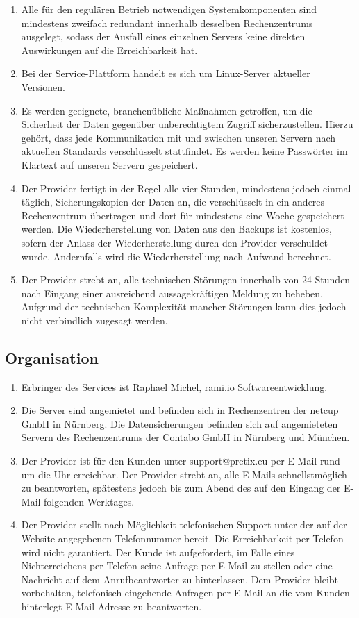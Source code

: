 \documentclass{terms}
\begin{document}
\begin{enumerate}
\item Alle für den regulären Betrieb notwendigen Systemkomponenten sind mindestens zweifach redundant innerhalb desselben Rechenzentrums ausgelegt, sodass der Ausfall eines einzelnen Servers keine direkten Auswirkungen auf die Erreichbarkeit hat.
\item Bei der Service-Plattform handelt es sich um Linux-Server aktueller Versionen.
\item Es werden geeignete, branchenübliche Maßnahmen getroffen, um die Sicherheit der Daten gegenüber unberechtigtem Zugriff sicherzustellen. Hierzu gehört, dass jede Kommunikation mit und zwischen unseren Servern nach aktuellen Standards verschlüsselt stattfindet. Es werden keine Passwörter im Klartext auf unseren Servern gespeichert.
\item Der Provider fertigt in der Regel alle vier Stunden, mindestens jedoch einmal täglich, Sicherungskopien der Daten an, die verschlüsselt in ein anderes Rechenzentrum übertragen und dort für mindestens eine Woche gespeichert werden. Die Wiederherstellung von Daten aus den Backups ist kostenlos, sofern der Anlass der Wiederherstellung durch den Provider verschuldet wurde. Andernfalls wird die Wiederherstellung nach Aufwand berechnet.
\item Der Provider strebt an, alle technischen Störungen innerhalb von 24 Stunden nach Eingang einer ausreichend aussagekräftigen Meldung zu beheben. Aufgrund der technischen Komplexität mancher Störungen kann dies jedoch nicht verbindlich zugesagt werden.
\end{enumerate}

\subsection{Organisation}
\begin{enumerate}
\item Erbringer des Services ist Raphael Michel, rami.io Softwareentwicklung.
\item Die Server sind angemietet und befinden sich in Rechenzentren der netcup GmbH in Nürnberg. Die Datensicherungen befinden sich auf angemieteten Servern des Rechenzentrums der Contabo GmbH in Nürnberg und München.
\item Der Provider ist für den Kunden unter support@pretix.eu per E-Mail rund um die Uhr erreichbar. Der Provider strebt an, alle E-Mails schnellstmöglich zu beantworten, spätestens jedoch bis zum Abend des auf den Eingang der E-Mail folgenden Werktages.
\item Der Provider stellt nach Möglichkeit telefonischen Support unter der auf der Website angegebenen Telefonnummer bereit. Die Erreichbarkeit per Telefon wird nicht garantiert. Der Kunde ist aufgefordert, im Falle eines Nichterreichens per Telefon seine Anfrage per E-Mail zu stellen oder eine Nachricht auf dem Anrufbeantworter zu hinterlassen. Dem Provider bleibt vorbehalten, telefonisch eingehende Anfragen per E-Mail an die vom Kunden hinterlegt E-Mail-Adresse zu beantworten.
\end{enumerate}
\end{document}
